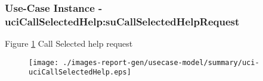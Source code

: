 
	\subsubsection{Use-Case Instance - uciCallSelectedHelp:suCallSelectedHelpRequest}
	

	
	Figure \ref{fig:lu.uni.lassy.excalibur.g01.specification-RE-UC-uci-uciCallSelectedHelp}
	Call Selected help request
	
	\begin{figure}[htbp]
	\begin{center}
	
	\texttt{[image: ./images-report-gen/usecase-model/summary/uci-uciCallSelectedHelp.eps]}
	\end{center}
	\caption[lu.uni.lassy.excalibur.g01.specification Sequence Diagram: uci-uciCallSelectedHelp]{}
	\label{fig:lu.uni.lassy.excalibur.g01.specification-RE-UC-uci-uciCallSelectedHelp}
	\end{figure}
	\vspace{0.5cm}
